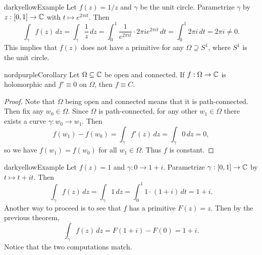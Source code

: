 \begin{mybox}{darkyellow}{Example}
  Let $f(z) = 1 / z$ and $\gamma$ be the unit circle.
  Parametrize $\gamma$ by $z : [0, 1] \to \mathbb{C}$ with
  $t \mapsto e^{2\pi it}$. Then
  \[
    \int_{\gamma} f(z) \, dz
    = \int_{\gamma} \frac{1}{z} \, dz
    = \int_0^1 \frac{1}{e^{2\pi it}} \cdot 2\pi i e^{2\pi it}\, dt
    = \int_0^1 2\pi i\, dt
    = 2\pi i
    \ne 0.
  \]
  This implies that $f(z)$ does not have a primitive
  for any $\Omega \supseteq S^1$, where $S^1$ is the
  unit circle.
\end{mybox}

\begin{mybox}{nordpurple}{Corollary}
  Let $\Omega \subseteq \mathbb{C}$ be open and connected.
  If $f : \Omega \to \mathbb{C}$ is holomorphic and
  $f' \equiv 0$ on $\Omega$, then $f \equiv C$.
\end{mybox}

\begin{proof}
  Note that $\Omega$ being open and connected means
  that it is path-connected. Then fix any
  $w_0 \in \Omega$. Since $\Omega$ is path-connected,
  for any other $w_1 \in \Omega$ there exists a curve
  $\gamma : w_0 \to w_1$. Then
  \[
    f(w_1) - f(w_0)
    = \int_{\gamma} f'(z) \, dz
    = \int_{\gamma} 0 \, dz
    = 0,
  \]
  so we have $f(w_1) = f(w_0)$ for all $w_1 \in \Omega$.
  Thus $f$ is constant.
\end{proof}

\begin{mybox}{darkyellow}{Example}
  Let $f(z) = 1$ and $\gamma : 0 \to 1 + i$. Parametrize
  $\gamma : [0, 1] \to \mathbb{C}$ by
  $t \mapsto t + it$. Then
  \[
    \int_{\gamma} f(z) \, dz
    = \int_{\gamma} 1 \, dz
    = \int_0^1 1 \cdot (1 + i)\, dt
    = 1 + i.
  \]
  Another way to proceed is to see that $f$ has a
  primitive $F(z) = z$. Then by the previous theorem,
  \[
    \int_{\gamma} f(z) \, dz
    = F(1 + i) - F(0)
    = 1 + i.
  \]
  Notice that the two computations match.
\end{mybox}
